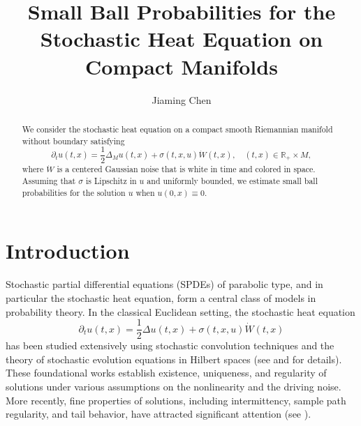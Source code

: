 \documentclass[12pt]{amsart}
\numberwithin{equation}{section}
\newcommand{\1}{\mathbf{1}}
\begin{document}
\title[Small Ball Probabilities for SPDE on Compact Manifolds]{Small Ball Probabilities for the Stochastic Heat Equation on Compact Manifolds}
\author{Jiaming Chen}
\address{Dept. of Mathematics
\\Imperial College
\\London, UK}
\begin{abstract}
We consider the stochastic heat equation on a compact smooth Riemannian manifold without boundary satisfying
\begin{equation*}
\partial_tu(t,x)=\frac{1}{2}\Delta_Mu(t,x)+\sigma(t,x,u)\dot{W}(t,x),\quad (t,x)\in\mathbb{R}_+\times M,
\end{equation*}
where $\dot{W}$ is a centered Gaussian noise that is white in time and colored in space. Assuming that $\sigma$ is Lipschitz in $u$ and uniformly bounded, we estimate small ball probabilities for the solution $u$ when $u(0,x)\equiv 0$.
\end{abstract}
\maketitle

\section{Introduction}
Stochastic partial differential equations (SPDEs) of parabolic type, and in particular the stochastic heat equation, form a central class of models in probability theory. In the classical Euclidean setting, the stochastic heat equation
\begin{equation}
\partial_t u(t,x)=\frac{1}{2}\Delta u(t,x)+\sigma(t,x,u)\dot{W}(t,x)
\end{equation}
has been studied extensively using stochastic convolution techniques and the theory of stochastic evolution equations in Hilbert spaces (see \cite{walsh1986anintroductiontostochastic} and \cite{da2014stochastic} for details). These foundational works establish existence, uniqueness, and regularity of solutions under various assumptions on the nonlinearity and the driving noise. More recently, fine properties of solutions, including intermittency, sample path regularity, and tail behavior, have attracted significant attention (see \cite{khoshnevisan2025points, guo2025sample, chen2025global, chen2025parabolic, khoshnevisan2024small, hu2025spatio, qian2026temporal}).
\end{document}
